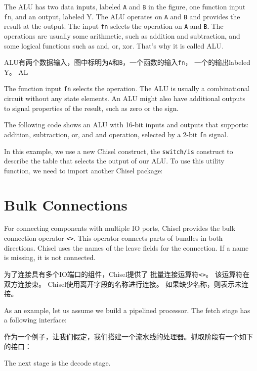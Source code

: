 \documentclass[%
    10pt,
    headinclude, footexclude,
    openright, %
    notitlepage,
    cleardoubleempty,
    headsepline,
    pointlessnumbers,
    bibtotoc, idxtotoc,
    ]{scrbook}
\newcommand{\code}[1]{{\small{\texttt{#1}}}}
\begin{document}
The ALU has two data inputs, labeled \code{A} and \code{B} in the figure, one function input \code{fn},
and an output, labeled {Y}. The ALU operates on \code{A} and \code{B} and provides the result
at the output. The input \code{fn} selects the operation on \code{A} and \code{B}.
The operations are usually some arithmetic, such as addition and subtraction, and some logical
functions such as and, or, xor. That's why it is called ALU.

ALU有两个数据输入，图中标明为\code{A}和\code{B}，一个函数的输入\code{fn}，
一个的输出labeled {Y}。 AL

The function input \code{fn} selects the operation. The ALU is usually a combinational
circuit without any state elements. An ALU might also have additional outputs to signal properties
of the result, such as zero or the sign.

The following code shows an ALU with 16-bit inputs and outputs that supports: addition, subtraction, or, and and
operation, selected by a 2-bit \code{fn} signal.


\noindent In this example, we use a new Chisel construct, the \code{switch/is} construct to describe
the table that selects the output of our ALU.
To use this utility function, we need to import another Chisel package:


\section{Bulk Connections}

For connecting components with multiple IO ports, Chisel provides the
bulk connection operator \code{<>}. This operator connects parts of bundles
in both directions. Chisel uses the names of the leave fields for the connection.
If a name is missing, it is not connected.

为了连接具有多个IO端口的组件，Chisel提供了
批量连接运算符\code{<>}。 该运算符在双方连接束。 Chisel使用离开字段的名称进行连接。
如果缺少名称，则表示未连接。


As an example, let us assume we build a pipelined processor. The fetch
stage has a following interface:

作为一个例子，让我们假定，我们搭建一个流水线的处理器。抓取阶段有一个如下的接口：


\noindent The next stage is the decode stage.
\end{document}
